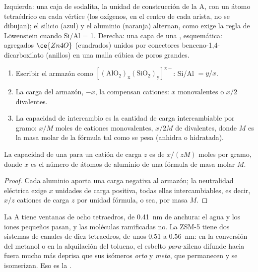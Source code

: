 \begin{omfigure}
{\small Izquierda: una caja de sodalita, la unidad de construcción de la  A, con un
átomo tetraédrico en cada vértice (los oxígenos, en el centro de cada arista, no se
dibujan); el silicio (azul) y el aluminio (naranja) alternan, como exige la regla de Löwenstein
cuando Si/Al = 1. Derecha: una capa de una ,
esquemática: agregados $\ce{Zn4O}$ (cuadrados) unidos por conectores benceno-1,4-dicarboxilato
(anillos) en una malla cúbica de poros grandes.}
\end{omfigure}

\begin{method}\label{met:b3:inorganic-materials:zeolite-formula}
\begin{enumerate}
  \item Escribir el armazón como $\mathrm{[(AlO_2)_x(SiO_2)_y]^{x-}}$: Si/Al $= y/x$.
  \item La carga del armazón, $-x$, la compensan cationes: $x$ monovalentes o $x/2$
        divalentes.
  \item La capacidad de intercambio es la cantidad de carga intercambiable por gramo:
        $x/M$ moles de cationes monovalentes, $x/2M$ de divalentes, donde $M$ es la
        masa molar de la fórmula tal como se pesa (anhidra o hidratada).
\end{enumerate}
\end{method}

\begin{proposition}\label{prop:b3:inorganic-materials:exchange-capacity}
La capacidad de una  para un catión de carga $z$ es de $x/(zM)$ moles por gramo,
donde $x$ es el número de átomos de aluminio de una fórmula de masa molar $M$.
\end{proposition}

\begin{proof}
Cada aluminio aporta una carga negativa al armazón; la neutralidad
eléctrica exige $x$ unidades de carga positiva, todas ellas intercambiables, es decir,
$x/z$ cationes de carga $z$ por unidad fórmula, o sea, por masa $M$.
\end{proof}

La  A tiene ventanas de ocho tetraedros, de \qty{0.41}{nm} de anchura: el agua y los iones
pequeños pasan, y las moléculas ramificadas no. La ZSM-5 tiene dos sistemas de canales de diez
tetraedros, de unos 0.51 a \qty{0.56}{nm}: en la conversión del metanol o en la
alquilación del tolueno, el esbelto \textit{para}-xileno difunde hacia fuera mucho más deprisa que
sus isómeros \textit{orto} y \textit{meta}, que permanecen y se isomerizan. Eso es la
.

